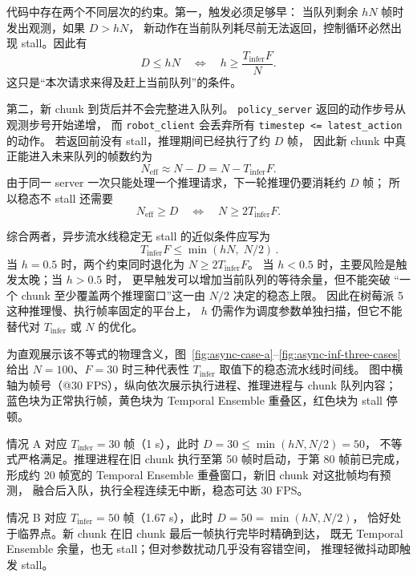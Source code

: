 代码中存在两个不同层次的约束。第一，触发必须足够早：
当队列剩余 $hN$ 帧时发出观测，如果 $D>hN$，
新动作在当前队列耗尽前无法返回，控制循环必然出现 stall。因此有
\begin{equation}
  D \leq hN
  \quad\Longleftrightarrow\quad
  h \geq \frac{T_{\text{infer}}F}{N}.
\end{equation}
这只是``本次请求来得及赶上当前队列''的条件。

第二，新 chunk 到货后并不会完整进入队列。
\texttt{policy\_server} 返回的动作步号从观测步号开始递增，
而 \texttt{robot\_client} 会丢弃所有
\texttt{timestep <= latest\_action} 的动作。
若返回前没有 stall，推理期间已经执行了约 $D$ 帧，
因此新 chunk 中真正能进入未来队列的帧数约为
\begin{equation}
  N_{\text{eff}} \approx N - D = N - T_{\text{infer}}F.
\end{equation}
由于同一 server 一次只能处理一个推理请求，下一轮推理仍要消耗约 $D$ 帧；
所以稳态不 stall 还需要
\begin{equation}
  N_{\text{eff}} \geq D
  \quad\Longleftrightarrow\quad
  N \geq 2T_{\text{infer}}F.
\end{equation}

综合两者，异步流水线稳定无 stall 的近似条件应写为
\begin{equation}
  \boxed{\,T_{\text{infer}}F \leq \min(hN,\; N/2)\,}.
\end{equation}
当 $h=0.5$ 时，两个约束同时退化为 $N \geq 2T_{\text{infer}}F$。
当 $h<0.5$ 时，主要风险是触发太晚；当 $h>0.5$ 时，
更早触发可以增加当前队列的等待余量，但不能突破
``一个 chunk 至少覆盖两个推理窗口''这一由 $N/2$ 决定的稳态上限。
因此在树莓派 5 这种推理慢、执行帧率固定的平台上，
$h$ 仍需作为调度参数单独扫描，但它不能替代对 $T_{\text{infer}}$ 或 $N$ 的优化。

为直观展示该不等式的物理含义，图~\ref{fig:async-case-a}--\ref{fig:async-inf-three-cases}
给出 $N=100$、$F=30$ 时三种代表性 $T_{\text{infer}}$ 取值下的稳态流水线时间线。
图中横轴为帧号（@30 FPS），纵向依次展示执行进程、推理进程与 chunk 队列内容；
蓝色块为正常执行帧，黄色块为 Temporal Ensemble 重叠区，红色块为 stall 停顿。

情况 A 对应 $T_{\text{infer}}=30$ 帧（1 s），此时 $D=30 \leq \min(hN,N/2)=50$，
不等式严格满足。推理进程在旧 chunk 执行至第 50 帧时启动，于第 80 帧前已完成，
形成约 20 帧宽的 Temporal Ensemble 重叠窗口，新旧 chunk 对这批帧均有预测，
融合后入队，执行全程连续无中断，稳态可达 30 FPS。

情况 B 对应 $T_{\text{infer}}=50$ 帧（1.67 s），此时 $D=50 = \min(hN,N/2)$，
恰好处于临界点。新 chunk 在旧 chunk 最后一帧执行完毕时精确到达，
既无 Temporal Ensemble 余量，也无 stall；但对参数扰动几乎没有容错空间，
推理轻微抖动即触发 stall。

